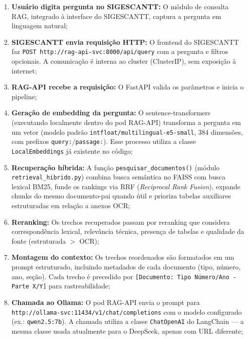 \documentclass[12pt, a4paper]{article}
\begin{document}
\begin{enumerate}[label=\textbf{Passo~\arabic*.}]
  \item \textbf{Usuário digita pergunta no SIGESCANTT:} O módulo de consulta RAG, integrado à interface do SIGESCANTT, captura a pergunta em linguagem natural;

  \item \textbf{SIGESCANTT envia requisição HTTP:} O frontend do SIGESCANTT faz \texttt{POST http://rag-api-svc:8000/api/query} com a pergunta e filtros opcionais. A comunicação é interna ao cluster (ClusterIP), sem exposição à internet;

  \item \textbf{RAG-API recebe a requisição:} O FastAPI valida os parâmetros e inicia o pipeline;

  \item \textbf{Geração de embedding da pergunta:} O sentence-transformers (executando localmente dentro do pod RAG-API) transforma a pergunta em um vetor (modelo padrão \texttt{intfloat/multilingual-e5-small}, 384 dimensões, com prefixos \texttt{query:}/\texttt{passage:}). Esse processo utiliza a classe \texttt{LocalEmbeddings} já existente no código;

  \item \textbf{Recuperação híbrida:} A função \texttt{pesquisar\_documentos()} (módulo \texttt{retrieval\_hibrido.py}) combina busca semântica no FAISS com busca lexical BM25, funde os rankings via RRF (\textit{Reciprocal Rank Fusion}), expande chunks do mesmo documento-pai quando útil e prioriza tabelas auxiliares estruturadas em relação a anexos OCR;

  \item \textbf{Reranking:} Os trechos recuperados passam por reranking que considera correspondência lexical, relevância técnica, presença de tabelas e qualidade da fonte (estruturada $>$ OCR);

  \item \textbf{Montagem do contexto:} Os trechos reordenados são formatados em um prompt estruturado, incluindo metadados de cada documento (tipo, número, ano, seção). Cada trecho é precedido por \texttt{[Documento: Tipo Número/Ano - Parte X/Y]} para rastreabilidade;

  \item \textbf{Chamada ao Ollama:} O pod RAG-API envia o prompt para \\ \texttt{http://ollama-svc:11434/v1/chat/completions} com o modelo configurado (ex.: \texttt{qwen2.5:7b}). A chamada utiliza a classe \texttt{ChatOpenAI} do LangChain --- a mesma classe usada atualmente para o DeepSeek, apenas com URL diferente;


\end{enumerate}
\end{document}

